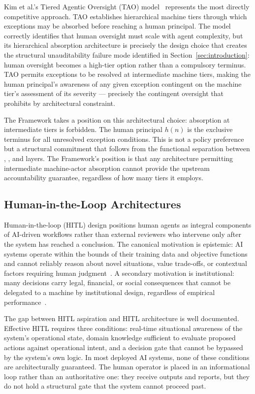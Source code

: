 Kim et al.'s Tiered Agentic Oversight (TAO) model~\cite{kim2025tao} represents the most directly competitive approach. TAO establishes hierarchical machine tiers through which exceptions may be absorbed before reaching a human principal. The model correctly identifies that human oversight must scale with agent complexity, but its hierarchical absorption architecture is precisely the design choice that creates the structural unauditability failure mode identified in Section~\ref{sec:introduction}: human oversight becomes a high-tier option rather than a compulsory terminus. TAO permits exceptions to be resolved at intermediate machine tiers, making the human principal's awareness of any given exception contingent on the machine tier's assessment of its severity --- precisely the contingent oversight that \bxthree{} prohibits by architectural constraint.

The \bxthree{} Framework takes a position on this architectural choice: absorption at intermediate tiers is forbidden. The human principal $h(n)$ is the exclusive terminus for all unresolved exception conditions. This is not a policy preference but a structural commitment that follows from the functional separation between \purpose{}, \bounds{}, and \fact{} layers. The Framework's position is that any architecture permitting intermediate machine-actor absorption cannot provide the upstream accountability guarantee, regardless of how many tiers it employs.

\subsection{Human-in-the-Loop Architectures}

Human-in-the-loop (HITL) design positions human agents as integral components of AI-driven workflows rather than external reviewers who intervene only after the system has reached a conclusion. The canonical motivation is epistemic: AI systems operate within the bounds of their training data and objective functions and cannot reliably reason about novel situations, value trade-offs, or contextual factors requiring human judgment~\cite{tristr81}. A secondary motivation is institutional: many decisions carry legal, financial, or social consequences that cannot be delegated to a machine by institutional design, regardless of empirical performance~\cite{bansal2019}.

The gap between HITL aspiration and HITL architecture is well documented. Effective HITL requires three conditions: real-time situational awareness of the system's operational state, domain knowledge sufficient to evaluate proposed actions against operational intent, and a decision gate that cannot be bypassed by the system's own logic. In most deployed AI systems, none of these conditions are architecturally guaranteed. The human operator is placed in an informational loop rather than an authoritative one: they receive outputs and reports, but they do not hold a structural gate that the system cannot proceed past.

